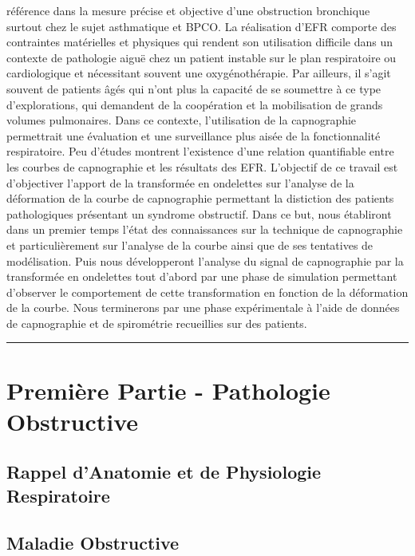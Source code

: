 \documentclass[12pt,]{article}
\begin{document}
référence dans la mesure précise et objective d'une obstruction
bronchique surtout chez le sujet asthmatique et BPCO. La réalisation
d'EFR comporte des contraintes matérielles et physiques qui rendent son
utilisation difficile dans un contexte de pathologie aiguë chez un
patient instable sur le plan respiratoire ou cardiologique et
nécessitant souvent une oxygénothérapie. Par ailleurs, il s'agit souvent
de patients âgés qui n'ont plus la capacité de se soumettre à ce type
d'explorations, qui demandent de la coopération et la mobilisation de
grands volumes pulmonaires. Dans ce contexte, l'utilisation de la
capnographie permettrait une évaluation et une surveillance plus aisée
de la fonctionnalité respiratoire. Peu d'études montrent l'existence
d'une relation quantifiable entre les courbes de capnographie et les
résultats des EFR. L'objectif de ce travail est d'objectiver l'apport de
la transformée en ondelettes sur l'analyse de la déformation de la
courbe de capnographie permettant la distiction des patients
pathologiques présentant un syndrome obstructif. Dans ce but, nous
établiront dans un premier temps l'état des connaissances sur la
technique de capnographie et particulièrement sur l'analyse de la courbe
ainsi que de ses tentatives de modélisation. Puis nous développeront
l'analyse du signal de capnographie par la transformée en ondelettes
tout d'abord par une phase de simulation permettant d'observer le
comportement de cette transformation en fonction de la déformation de la
courbe. Nous terminerons par une phase expérimentale à l'aide de données
de capnographie et de spirométrie recueillies sur des patients.

\pagebreak

\begin{center}\rule{0.5\linewidth}{\linethickness}\end{center}

\section{Première Partie - Pathologie
Obstructive}\label{premiere-partie---pathologie-obstructive}

\subsection{Rappel d'Anatomie et de Physiologie
Respiratoire}\label{rappel-danatomie-et-de-physiologie-respiratoire}

\subsection{Maladie Obstructive}\label{maladie-obstructive}
\end{document}
